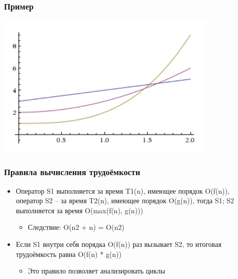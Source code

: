 \documentclass[xetex,mathserif,serif]{beamer}
\begin{document}
	\begin{frame}
		\frametitle{Пример}
		\begin{center}
			\includegraphics[width=0.8\textwidth]{example.png}
		\end{center}
	\end{frame}

	\begin{frame}
		\frametitle{Правила вычисления трудоёмкости}
		\begin{itemize}
			\item Оператор S1 выполняется за время T1(n), имеющее порядок O(f(n)), оператор S2 – за время T2(n), имеющее порядок O(g(n)), тогда S1; S2 выполняется за время O(max(f(n), g(n)))
			\begin{itemize}
				\item Следствие: O(n2 + n) = O(n2)
			\end{itemize}
			\item Если S1 внутри себя порядка O(f(n)) раз вызывает S2, то итоговая трудоёмкость равна O(f(n) * g(n))
			\begin{itemize}
				\item Это правило позволяет анализировать циклы
			\end{itemize}	
		\end{itemize}
	\end{frame}
	
\end{document}
